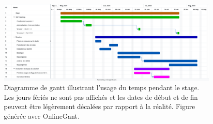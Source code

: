 \documentclass[../main]{subfiles} %
\begin{document}
\addto\extrasfrench{\protected\edef:{\unexpanded\expandafter{:}}}

\begin{figure}[ht]
    \centering
    \includegraphics[width=1\textwidth]{../Illustrations/Gantt.png}
    \caption{Diagramme de gantt illustrant l'usage du temps pendant le stage. Les jours fériés ne sont pas affichés et les dates de début et de fin peuvent être légèrement décalées par rapport à la réalité. Figure générée avec \gls{OnlineGant}. }
    \label{fig:gantt}
\end{figure}


\end{document}
